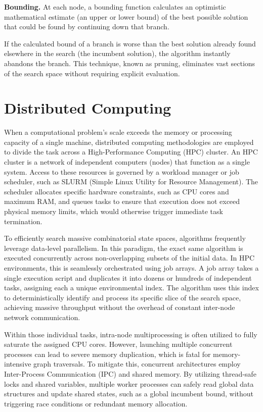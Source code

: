 \textbf{Bounding.}
At each node, a bounding function calculates an optimistic mathematical estimate (an upper or lower bound) of the best possible solution that could be found by continuing down that branch.

\medskip

If the calculated bound of a branch is worse than the best solution already found elsewhere in the search (the incumbent solution), the algorithm instantly abandons the branch. This technique, known as pruning, eliminates vast sections of the search space without requiring explicit evaluation.

\section{Distributed Computing}
\label{sec:distributed_computing}

When a computational problem's scale exceeds the memory or processing capacity of a single machine, distributed computing methodologies are employed to divide the task across a High-Performance Computing (HPC) cluster. An HPC cluster is a network of independent computers (nodes) that function as a single system. Access to these resources is governed by a workload manager or job scheduler, such as SLURM (Simple Linux Utility for Resource Management). The scheduler allocates specific hardware constraints, such as CPU cores and maximum RAM, and queues tasks to ensure that execution does not exceed physical memory limits, which would otherwise trigger immediate task termination.

\medskip

To efficiently search massive combinatorial state spaces, algorithms frequently leverage data-level parallelism. In this paradigm, the exact same algorithm is executed concurrently across non-overlapping subsets of the initial data. In HPC environments, this is seamlessly orchestrated using job arrays. A job array takes a single execution script and duplicates it into dozens or hundreds of independent tasks, assigning each a unique environmental index. The algorithm uses this index to deterministically identify and process its specific slice of the search space, achieving massive throughput without the overhead of constant inter-node network communication.

\medskip

Within those individual tasks, intra-node multiprocessing is often utilized to fully saturate the assigned CPU cores. However, launching multiple concurrent processes can lead to severe memory duplication, which is fatal for memory-intensive graph traversals. To mitigate this, concurrent architectures employ Inter-Process Communication (IPC) and shared memory. By utilizing thread-safe locks and shared variables, multiple worker processes can safely read global data structures and update shared states, such as a global incumbent bound, without triggering race conditions or redundant memory allocation.


